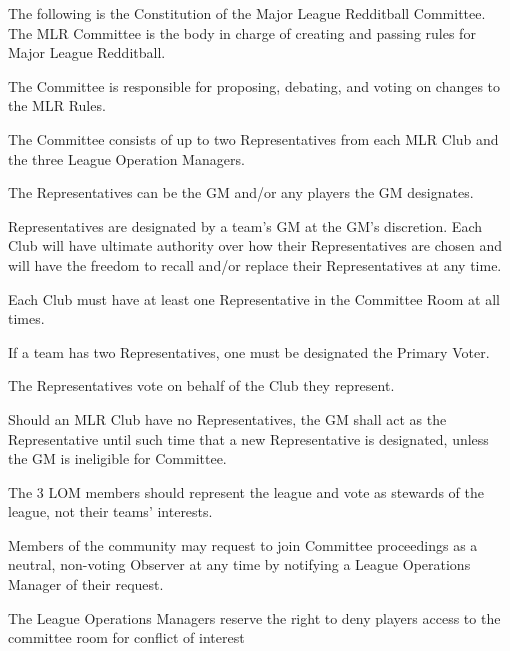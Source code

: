 

The following is the Constitution of the Major League Redditball Committee. The MLR Committee is the body in charge of creating and passing rules for Major League Redditball.

\begin{deepEnumerate}
    \item The Committee is responsible for proposing, debating, and voting on changes to the MLR Rules.
    \item The Committee consists of up to two Representatives from each MLR Club and the three League Operation Managers. 
    \item The Representatives can be the GM and/or any players the GM designates.
    \begin{deepEnumerate}
        \item Representatives are designated by a team's GM at the GM's discretion. Each Club will have ultimate authority over how their Representatives are chosen
        and will have the freedom to recall and/or replace their Representatives at any time.
        \item Each Club must have at least one Representative in the Committee Room at all times.
        \item If a team has two Representatives, one must be designated the Primary Voter.
        \item The Representatives vote on behalf of the Club they represent.
    \end{deepEnumerate}
    \item Should an MLR Club have no Representatives, the GM shall act as the Representative until such time that a new Representative is designated,
    unless the GM is ineligible for Committee.
    \item The 3 LOM members should represent the league and vote as stewards of the league, not their teams’ interests.
    \item Members of the community may request to join Committee proceedings as a neutral, non-voting Observer at any time by notifying a League Operations Manager of their request.
    \begin{deepEnumerate}
        \item The League Operations Managers reserve the right to deny players access to the committee room for conflict of interest

\end{deepEnumerate}
\end{deepEnumerate}
